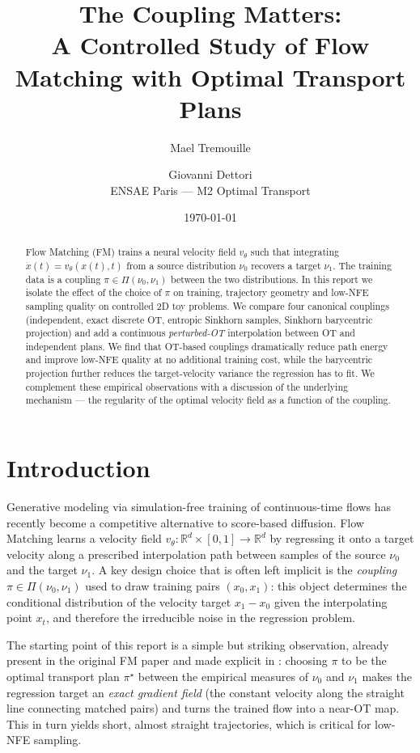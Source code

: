 \documentclass[11pt,a4paper]{article}
\title{The Coupling Matters: \\ A Controlled Study of Flow Matching with Optimal Transport Plans}
\author{Mael Tremouille \and Giovanni Dettori \\ ENSAE Paris --- M2 Optimal Transport}
\date{\today}
\newcommand{\R}{\mathbb{R}}
\begin{document}
\maketitle

\begin{abstract}
Flow Matching (FM) trains a neural velocity field $v_\theta$ such that integrating
$\dot{x}(t) = v_\theta(x(t), t)$ from a source distribution $\nu_0$ recovers a target
$\nu_1$.  The training data is a coupling $\pi \in \Pi(\nu_0, \nu_1)$ between the two
distributions.  In this report we isolate the effect of the choice of $\pi$ on
training, trajectory geometry and low-NFE sampling quality on controlled 2D toy
problems.  We compare four canonical couplings (independent, exact discrete OT,
entropic Sinkhorn samples, Sinkhorn barycentric projection) and add a continuous
\emph{perturbed-OT} interpolation between OT and independent plans.  We find that
OT-based couplings dramatically reduce path energy and improve low-NFE quality at
no additional training cost, while the barycentric projection further reduces the
target-velocity variance the regression has to fit.  We complement these
empirical observations with a discussion of the underlying mechanism --- the
regularity of the optimal velocity field as a function of the coupling.
\end{abstract}

\section{Introduction}
\label{sec:intro}

Generative modeling via simulation-free training of continuous-time flows has
recently become a competitive alternative to score-based diffusion.  Flow
Matching \cite{lipman2023flow} learns a velocity field $v_\theta : \R^d \times
[0,1] \to \R^d$ by regressing it onto a target velocity along a prescribed
interpolation path between samples of the source $\nu_0$ and the target $\nu_1$.
A key design choice that is often left implicit is the \emph{coupling}
$\pi \in \Pi(\nu_0, \nu_1)$ used to draw training pairs $(x_0, x_1)$: this object
determines the conditional distribution of the velocity target $x_1 - x_0$ given
the interpolating point $x_t$, and therefore the irreducible noise in the
regression problem.

The starting point of this report is a simple but striking observation, already
present in the original FM paper and made explicit in \cite{tong2023improving,
pooladian2023multisample}: choosing $\pi$ to be the optimal transport plan
$\pi^\star$ between the empirical measures of $\nu_0$ and $\nu_1$ makes the
regression target an \emph{exact gradient field} (the constant velocity along the
straight line connecting matched pairs) and turns the trained flow into a near-OT
map.  This in turn yields short, almost straight trajectories, which is critical
for low-NFE sampling.
\end{document}
